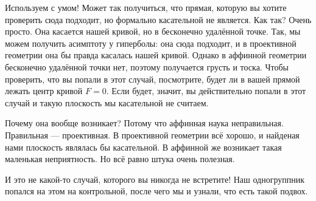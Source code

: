 \begin{remark}
    Используем с умом! Может так получиться, что прямая, которую вы хотите проверить сюда подходит, но формально касательной не является. Как так? Очень просто. Она касается нашей кривой, но в бесконечно удалённой точке. Так, мы можем получить асимптоту у гиперболы: она сюда подходит, и в проективной геометрии она бы правда касалась нашей кривой. Однако в аффинной геометрии бесконечно удалённой точки нет, поэтому получается грусть и тоска. Чтобы проверить, что вы попали в этот случай, посмотрите, будет ли в вашей прямой лежать центр кривой $F = 0$. Если будет, значит, вы действительно попали в этот случай и такую плоскость мы касательной не считаем.

    Почему она вообще возникает? Потому что аффинная наука неправильная. Правильная --- проективная. В проективной геометрии всё хорошо, и найденая нами плоскость являлась бы касательной. В аффинной же возникает такая маленькая неприятность. Но всё равно штука очень полезная.

    И это не какой-то случай, которого вы никогда не встретите! Наш одногруппник попался на этом на контрольной, после чего мы и узнали, что есть такой подвох.
\end{remark}

